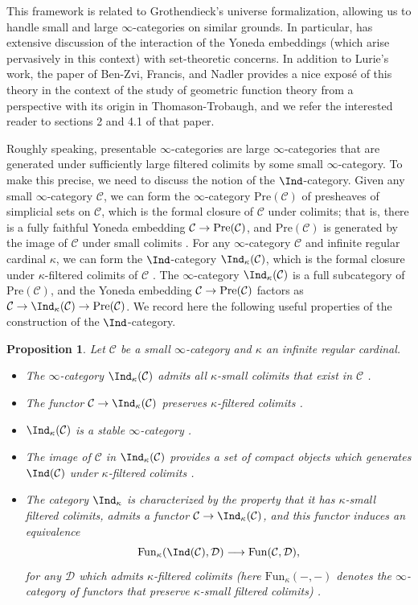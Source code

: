 \documentclass{amsart}
\renewcommand{\to}{\mathchoice{\longrightarrow}{\rightarrow}{\rightarrow}{\rightarrow}}
\let\catsymbfont\mathcal
\newcommand{\aC}{{\catsymbfont{C}}}
\newcommand{\aD}{{\catsymbfont{D}}}
\newcommand{\PPre}{\mathrm{Pre}}
\newcommand{\Fun}{\mathrm{Fun}} %
\renewcommand{\i}{\infty}
\numberwithin{equation}{section}
\newtheorem{proposition}[equation]{Proposition}
\theoremstyle{definition}
\begin{document}
This framework is related to Grothendieck's universe formalization,
allowing us to handle small and large $\i$-categories on similar
grounds.  In particular, \cite[\S 5]{HTT} has extensive discussion of
the interaction of the Yoneda embeddings (which arise pervasively in
this context) with set-theoretic concerns.  In addition to Lurie's
work, the paper of Ben-Zvi, Francis, and Nadler \cite{BFN} provides a
nice expos\'{e} of this theory in the context of the study of
geometric function theory from a perspective with its origin in
Thomason-Trobaugh, and we refer the interested reader to sections 2 and
4.1 of that paper.

Roughly speaking, presentable $\i$-categories are large
$\i$-categories that are generated under sufficiently large filtered
colimits by some small $\i$-category.  To make this precise, we need
to discuss the notion of the $\Ind$-category.
Given any small $\i$-category $\aC$, we can form the $\i$-category
$\PPre(\aC)$ of presheaves of simplicial sets on $\aC$, which is the
formal closure of $\aC$ under colimits; that is, there is a
fully faithful Yoneda embedding $\aC
\to \PPre(\aC)$, and $\PPre(\aC)$ is generated by the image of $\aC$
under small colimits \cite[5.1.5.8]{HTT}.  For any $\i$-category $\aC$
and infinite regular cardinal $\kappa$, we can form the $\Ind$-category
$\Ind_\kappa(\aC)$, which is the formal closure under $\kappa$-filtered
colimits of $\aC$ \cite[\S 5.3.5]{HTT}.  The $\i$-category
$\Ind_\kappa(\aC)$ is a full subcategory of $\PPre(\aC)$, and the
Yoneda embedding $\aC \to \PPre(\aC)$ factors as
$\aC \to \Ind_{\kappa}(\aC)
\to \PPre(\aC)$.  We record here the following useful properties of
the construction of the $\Ind$-category.

\begin{proposition}\label{prop:Ind}
Let $\aC$ be a small $\i$-category and $\kappa$ an infinite regular
cardinal.
\begin{itemize}
\item The $\i$-category $\Ind_{\kappa}(\aC)$ admits all $\kappa$-small
colimits that exist in $\aC$ \cite[5.3.5.14, 5.5.1.1]{HTT}. 
\item The functor $\aC \to \Ind_{\kappa}(\aC)$ preserves
$\kappa$-filtered colimits \cite[5.3.5.2,
5.3.5.3]{HTT}. 
\item $\Ind_{\kappa}(\aC)$ is a stable $\i$-category \cite[1.1.3.6]{HAG}.
\item The image of $\aC$ in $\Ind_{\kappa}(\aC)$ provides a set of
compact objects which generates $\Ind(\aC)$ under $\kappa$-filtered
colimits \cite[5.3.5.5,5.3.5.11]{HTT}.
\item The category $\Ind_{\kappa}$ is characterized by the property
that it has $\kappa$-small filtered colimits, admits a functor
$\aC \to \Ind_{\kappa}(\aC)$, and this functor induces an equivalence
\[
\Fun_{\kappa}(\Ind(\aC), \aD) \to \Fun(\aC,\aD), 
\]
for any $\aD$ which admits $\kappa$-filtered colimits (here
$\Fun_{\kappa}(-,-)$ denotes the $\i$-category of functors that preserve
$\kappa$-small filtered colimits) \cite[5.3.5.10]{HTT}.
\end{itemize}
\end{proposition}
\end{document}
